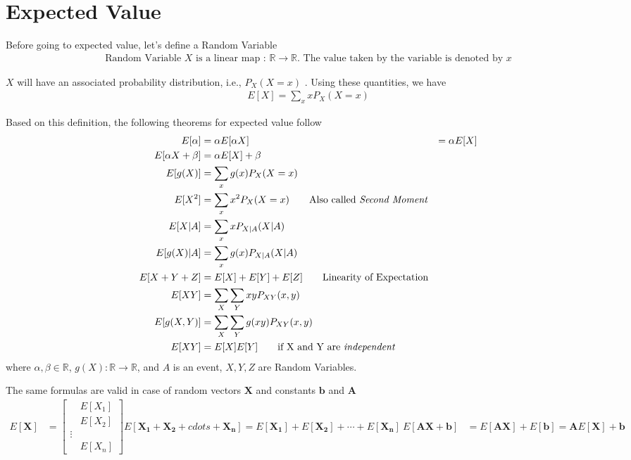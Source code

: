 \documentclass[../probability-notes.tex]{subfiles}
\begin{document}
    \section{Expected Value}
    Before going to expected value, let's define a Random Variable
    \begin{align*}
        \text{Random Variable } X \text{ is a linear map : } \mathbb{R} \to \mathbb{R} \text{. The value taken by the variable is denoted by } x
    \end{align*}
    
    $X$ will have an associated probability distribution, i.e., $P_{X}(X = x)$ . Using these quantities, we have
    \begin{align*}
        E[X] = \sum_x xP_{X}(X = x) \tag*{Expected Value}
    \end{align*}

    Based on this definition, the following theorems for expected value follow
    \begin{align*}
        E[\alpha] &= \alpha
        E[\alpha X] &= \alpha E[X] \\
        E[\alpha X + \beta] &= \alpha E[X] + \beta \\
        E[g(X)] &= \sum_x g(x)P_{X}(X = x) \\
        E[X^{2}] &= \sum_x x^{2} P_{X}(X = x) \tag*{Also called \emph{Second Moment}}\\
        E[X|A] &= \sum_{x} x P_{X|A}(X|A) \\
        E[g(X)|A] &= \sum_{x} g(x) P_{X|A}(X|A) \\
        E[X + Y + Z] &= E[X] + E[Y] + E[Z] \tag*{Linearity of Expectation}\\
        E[XY] &= \sum_{X} \sum_{Y} xy P_{XY}(x,y) \\
        E[g(X,Y)] &= \sum_{X} \sum_{Y} g(xy) P_{XY}(x,y) \\
        E[XY] &= E[X]E[Y] \tag*{if X and Y are \emph{independent}}
    \end{align*}
    where $\alpha, \beta \in \mathbb{R}$, $g(X) : \mathbb{R} \rightarrow \mathbb{R}$, and $A$ is an event, $X, Y, Z$ are Random Variables.\newline

    The same formulas are valid in case of random vectors $\mathbf{X}$ and constants $\mathbf{b}$ and $\mathbf{A}$
    \begin{align*}
        E[\mathbf{X}] &= \begin{bmatrix}
        &E[X_{1}]\\
        &E[X_{2}]\\
        \vdots\\
        &E[X_{n}]
        \end{bmatrix}
        E[\mathbf{X_{1}} + \mathbf{X_{2}} + cdots + \mathbf{X_{n}}] = E[\mathbf{X_{1}}] + E[\mathbf{X_{2}}] + \cdots + E[\mathbf{X_{n}}]\
        E[\mathbf{A}\mathbf{X}+\mathbf{b}] &= E[\mathbf{A}\mathbf{X}] + E[\mathbf{b}] = \mathbf{A}E[\mathbf{X}] + \mathbf{b}\\
    \end{align*}
\end{document}
